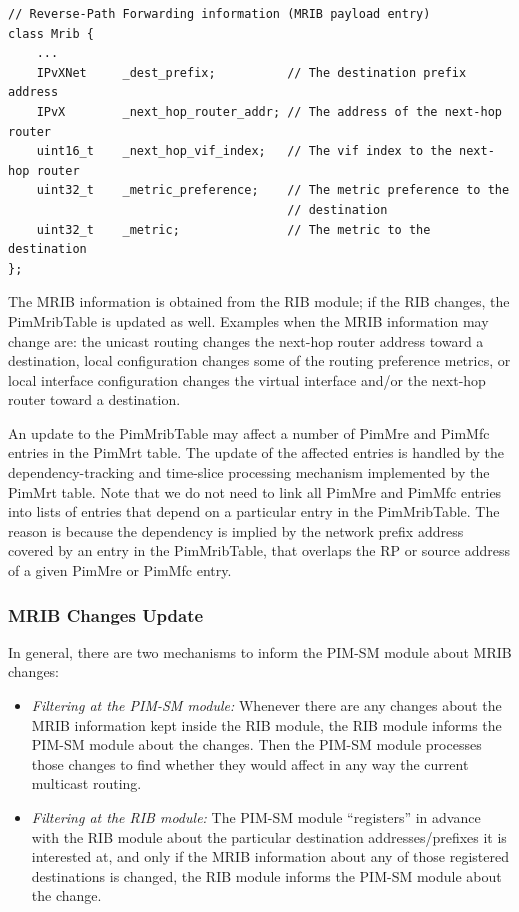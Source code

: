 \documentclass[11pt]{article}
\begin{document}
{\small
\begin{verbatim}
// Reverse-Path Forwarding information (MRIB payload entry)
class Mrib {
    ...
    IPvXNet     _dest_prefix;          // The destination prefix address
    IPvX        _next_hop_router_addr; // The address of the next-hop router
    uint16_t    _next_hop_vif_index;   // The vif index to the next-hop router
    uint32_t    _metric_preference;    // The metric preference to the
                                       // destination
    uint32_t    _metric;               // The metric to the destination
};
\end{verbatim}
} %


The MRIB information is obtained from the RIB
module; if the RIB changes, the
PimMribTable is updated as well. Examples when the MRIB information
may change are: the unicast routing changes the next-hop router address
toward a destination, local configuration changes some of the routing
preference metrics, or local interface configuration changes the virtual
interface and/or the next-hop router toward a destination.

An update to the PimMribTable may affect a number of PimMre and PimMfc
entries in the PimMrt table. The update of the affected entries is
handled by the dependency-tracking and time-slice processing mechanism
implemented by the PimMrt table. Note that we do not need to link all
PimMre and PimMfc entries into lists of entries that depend on a
particular entry in the PimMribTable. The reason is because the
dependency is implied by the network prefix address covered by an entry
in the PimMribTable, that overlaps the RP or source address of a given
PimMre or PimMfc entry.

\subsubsection{MRIB Changes Update}

In general, there are two mechanisms to inform the PIM-SM module about
MRIB changes:

\begin{itemize}
  \item \emph{Filtering at the PIM-SM module:}
  Whenever there are any changes about the MRIB information kept inside
  the RIB module, the RIB module informs the PIM-SM module
  about the changes. Then the PIM-SM module processes those changes to
  find whether they would affect in any way the current multicast
  routing.

  \item \emph{Filtering at the RIB module:}
  The PIM-SM module ``registers'' in advance with the RIB module about
  the particular destination addresses/prefixes it is interested at, and
  only if the MRIB information about any of those registered destinations
  is changed, the RIB module informs the PIM-SM module about the change.

\end{itemize}
\end{document}
